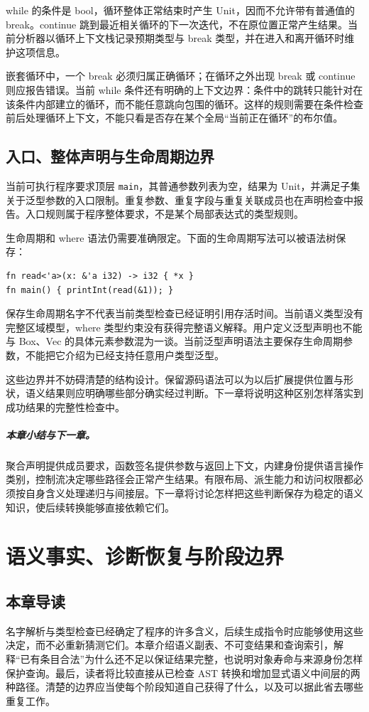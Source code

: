 while 的条件是 bool，循环整体正常结束时产生 Unit，因而不允许带有普通值的 break。continue 跳到最近相关循环的下一次迭代，不在原位置正常产生结果。当前分析器以循环上下文栈记录预期类型与 break 类型，并在进入和离开循环时维护这项信息。

嵌套循环中，一个 break 必须归属正确循环；在循环之外出现 break 或 continue 则应报告错误。当前 while 条件还有明确的上下文边界：条件中的跳转只能针对在该条件内部建立的循环，而不能任意跳向包围的循环。这样的规则需要在条件检查前后处理循环上下文，不能只看是否存在某个全局“当前正在循环”的布尔值。

\section{入口、整体声明与生命周期边界}
当前可执行程序要求顶层 \lstinline[language=Rustless]|main|，其普通参数列表为空，结果为 Unit，并满足子集关于泛型参数的入口限制。重复参数、重复字段与重复关联成员也在声明检查中报告。入口规则属于程序整体要求，不是某个局部表达式的类型规则。

生命周期和 where 语法仍需要准确限定。下面的生命周期写法可以被语法树保存：
\begin{lstlisting}[language=Rustless]
fn read<'a>(x: &'a i32) -> i32 { *x }
fn main() { printInt(read(&1)); }
\end{lstlisting}
保存生命周期名字不代表当前类型检查已经证明引用存活时间。当前语义类型没有完整区域模型，where 类型约束没有获得完整语义解释。用户定义泛型声明也不能与 Box、Vec 的具体元素参数混为一谈。当前泛型声明语法主要保存生命周期参数，不能把它介绍为已经支持任意用户类型泛型。

这些边界并不妨碍清楚的结构设计。保留源码语法可以为以后扩展提供位置与形状，语义结果则应明确哪些部分确实经过判断。下一章将说明这种区别怎样落实到成功结果的完整性检查中。

\paragraph{本章小结与下一章。}
聚合声明提供成员要求，函数签名提供参数与返回上下文，内建身份提供语言操作类别，控制流决定哪些路径会正常产生结果。有限布局、派生能力和访问权限都必须按自身含义处理递归与间接层。下一章将讨论怎样把这些判断保存为稳定的语义知识，使后续转换能够直接依赖它们。

\chapter{语义事实、诊断恢复与阶段边界}
\label{chap:semantic-boundary}
\section*{本章导读}
名字解析与类型检查已经确定了程序的许多含义，后续生成指令时应能够使用这些决定，而不必重新猜测它们。本章介绍语义副表、不可变结果和查询索引，解释“已有条目合法”为什么还不足以保证结果完整，也说明对象寿命与来源身份怎样保护查询。最后，读者将比较直接从已检查 AST 转换和增加显式语义中间层的两种路径。清楚的边界应当使每个阶段知道自己获得了什么，以及可以据此省去哪些重复工作。

